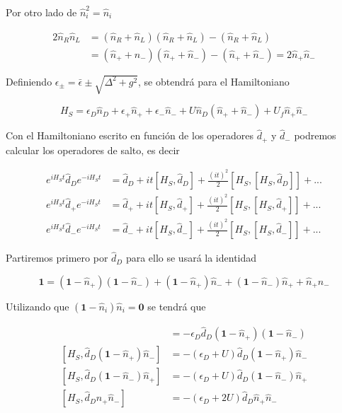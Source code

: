 \begin{appendixs}
Por otro lado de $\hat{n}^{2}_{i} = \hat{n}_{i}$

\begin{align*}
    2 \hat{n}_{R}\hat{n}_{L} & = (\hat{n}_{R} +\hat{n}_{L})(\hat{n}_{R} +\hat{n}_{L}) - (\hat{n}_{R} + \hat{n}_{L}) \\
    & = (\hat{n}_{+} +\hat{n}_{-})(\hat{n}_{+} +\hat{n}_{-}) - (\hat{n}_{+} + \hat{n}_{-})  = 2\hat{n}_{+}\hat{n}_{-}
\end{align*}

Definiendo $\epsilon_{\pm} = \bar{\epsilon} \pm \sqrt{\Delta^{2}+g^{2}}$, se obtendrá para el Hamiltoniano

\begin{equation}
    H_{S} = \epsilon_{D}\hat{n}_{D} + \epsilon_{+}\hat{n}_{+} + \epsilon_{-}\hat{n}_{-} + U\hat{n}_{D}(\hat{n}_{+} + \hat{n}_{-}) + U_{f}\hat{n}_{+}\hat{n}_{-}
    \label{apendix5:ec4}
\end{equation}

Con el Hamiltoniano escrito en función de los operadores $\hat{d}_{+}$ y $\hat{d}_{-}$ podremos calcular los operadores de salto, es decir

\begin{align*}
    e^{i H_{S}t}\hat{d}_{D}e^{-iH_{S}t} & = \hat{d}_{D} + it[H_{S},\hat{d}_{D}] + \frac{(it)^{2}}{2} [H_{S},[H_{S},\hat{d}_{D}]] +... \\
    e^{i H_{S}t}\hat{d}_{+}e^{-iH_{S}t} & = \hat{d}_{+} + it[H_{S},\hat{d}_{+}] + \frac{(it)^{2}}{2} [H_{S},[H_{S},\hat{d}_{+}]] +... \\
    e^{i H_{S}t}\hat{d}_{-}e^{-iH_{S}t} & = \hat{d}_{-} + it[H_{S},\hat{d}_{-}] + \frac{(it)^{2}}{2} [H_{S},[H_{S},\hat{d}_{-}]] +... 
\end{align*}

Partiremos primero por $\hat{d}_{D}$ para ello se usará la identidad

\begin{equation*}
    \textbf{1} = (\textbf{1} - \hat{n}_{+})(\textbf{1}-\hat{n}_{-}) + (\textbf{1} - \hat{n}_{+})\hat{n}_{-} + (\textbf{1} - \hat{n}_{-})\hat{n}_{+} + \hat{n}_{+}\hat{n}_{-} 
\end{equation*}

Utilizando que $(\textbf{1} - \hat{n}_{i})\hat{n}_{i} = \textbf{0}$ se tendrá que

\begin{align*}
    [H_{S},\hat{d}_{D}(\textbf{1}-\hat{n}_{+})(\textbf{1} - \hat{n}_{-})] & = - \epsilon_{D}\hat{d}_{D}(\textbf{1}-\hat{n}_{+})(\textbf{1} - \hat{n}_{-}) \\
    [H_{S},\hat{d}_{D}(\textbf{1}-\hat{n}_{+})\hat{n}_{-}] & = - (\epsilon_{D} + U)\hat{d}_{D}(\textbf{1} - \hat{n}_{+})\hat{n}_{-} \\
    [H_{S},\hat{d}_{D}(\textbf{1}-\hat{n}_{-})\hat{n}_{+}] & = - (\epsilon_{D} + U)\hat{d}_{D}(\textbf{1} - \hat{n}_{-})\hat{n}_{+} \\
    [H_{S},\hat{d}_{D}\hat{n}_{+}\hat{n}_{-}] & = - (\epsilon_{D} + 2U)\hat{d}_{D}\hat{n}_{+}\hat{n}_{-} 
\end{align*}


\end{appendixs}
